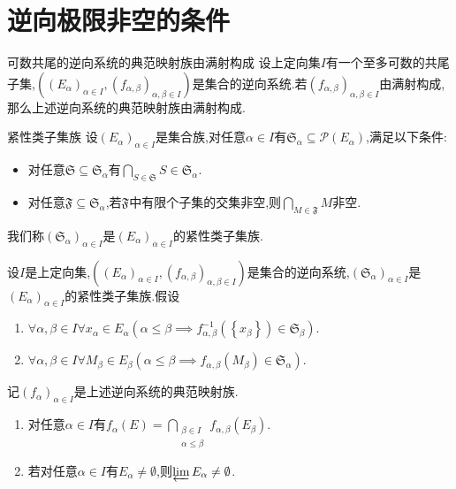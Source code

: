 \section{逆向极限非空的条件}

\begin{proposition}{可数共尾的逆向系统的典范映射族由满射构成}{}
	设上定向集$I$有一个至多可数的共尾子集,$\left(\left(E_{\alpha}\right)_{\alpha\in I},\left(f_{\alpha,\beta}\right)_{\alpha,\beta\in I}\right)$是集合的逆向系统.若$\left(f_{\alpha,\beta}\right)_{\alpha,\beta\in I}$由满射构成,那么上述逆向系统的典范映射族由满射构成.
\end{proposition}

\begin{definition}{紧性类子集族}{}
	设$\left(E_{\alpha}\right)_{\alpha\in I}$是集合族,对任意$\alpha\in I$有$\mathfrak{S}_{\alpha}\subseteq\mathcal{P}\left(E_{\alpha}\right)$,满足以下条件:
	\begin{itemize}
		\item 对任意$\mathfrak{S}\subseteq\mathfrak{S}_{\alpha}$有$\bigcap\limits_{S\in\mathfrak{S}}S\in\mathfrak{S}_{\alpha}$.
		\item 对任意$\mathfrak{F}\subseteq\mathfrak{S}_{\alpha}$,若$\mathfrak{F}$中有限个子集的交集非空,则$\bigcap\limits_{M\in\mathfrak{F}}M$非空.
	\end{itemize}
	我们称$\left(\mathfrak{S}_{\alpha}\right)_{\alpha\in I}$是$\left(E_{\alpha}\right)_{\alpha\in I}$的紧性类子集族.
\end{definition}

\begin{theorem}{}{}
	设$I$是上定向集,$\left(\left(E_{\alpha}\right)_{\alpha\in I},\left(f_{\alpha,\beta}\right)_{\alpha,\beta\in I}\right)$是集合的逆向系统,$\left(\mathfrak{S}_{\alpha}\right)_{\alpha\in I}$是$\left(E_{\alpha}\right)_{\alpha\in I}$的紧性类子集族.假设
	\begin{enumerate}
		\item $\forall\alpha,\beta\in I\forall x_{\alpha}\in E_{\alpha}\left(\alpha\leq\beta\implies f_{\alpha,\beta}^{-1}\left(\left\{x_{\beta}\right\}\right)\in\mathfrak{S}_{\beta}\right)$.
		\item $\forall\alpha,\beta\in I\forall M_{\beta}\in E_{\beta}\left(\alpha\leq\beta\implies f_{\alpha,\beta}\left(M_{\beta}\right)\in\mathfrak{S}_{\alpha}\right)$.
	\end{enumerate}
	记$\left(f_{\alpha}\right)_{\alpha\in I}$是上述逆向系统的典范映射族.
	\begin{enumerate}
		\item 对任意$\alpha\in I$有$f_{\alpha}\left(E\right)=\bigcap\limits_{\substack{\beta\in I\\ \alpha\leq\beta}}f_{\alpha,\beta}\left(E_{\beta}\right)$.
		\item 若对任意$\alpha\in I$有$E_{\alpha}\neq\emptyset$,则$\varprojlim E_{\alpha}\neq\emptyset$.
	\end{enumerate}
\end{theorem}

